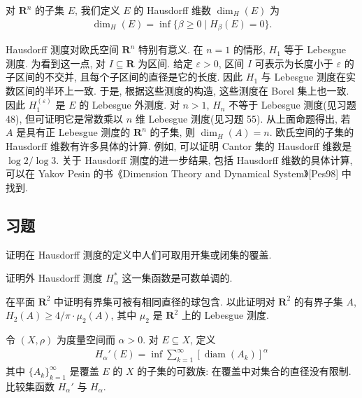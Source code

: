 \documentclass[../../main.tex]{subfiles}
\begin{document}
对 $\mathbf{R}^{n}$ 的子集 $E$, 我们定义 $E$ 的 Hausdorff 维数 $\dim_{H}(E)$ 为
\begin{align*}
\dim_{H}(E)=\inf\{\beta\geqslant 0\mid H_{\beta}(E)=0\}.
\end{align*}

Hausdorff 测度对欧氏空间 $\mathbf{R}^{n}$ 特别有意义. 在 $n=1$ 的情形, $H_{1}$ 等于 Lebesgue 测度. 为看到这一点, 对 $I\subseteq\mathbf{R}$ 为区间. 给定 $\varepsilon>0$, 区间 $I$ 可表示为长度小于 $\varepsilon$ 的子区间的不交并, 且每个子区间的直径是它的长度. 因此 $H_{1}$ 与 Lebesgue 测度在实数区间的半环上一致. 于是, 根据这些测度的构造, 这些测度在 Borel 集上也一致. 因此 $H_{1}^{(\varepsilon)}$ 是 $E$ 的 Lebesgue 外测度. 对 $n>1$, $H_{n}$ 不等于 Lebesgue 测度(见习题 48), 但可证明它是常数乘以 $n$ 维 Lebesgue 测度(见习题 55). 从上面命题得出, 若 $A$ 是具有正 Lebesgue 测度的 $\mathbf{R}^{n}$ 的子集, 则 $\dim_{H}(A)=n$. 欧氏空间的子集的 Hausdorff 维数有许多具体的计算. 例如, 可以证明 Cantor 集的 Hausdorff 维数是 $\log 2/\log 3$. 关于 Hausdorff 测度的进一步结果, 包括 Hausdorff 维数的具体计算, 可以在 Yakov Pesin 的书《Dimension Theory and Dynamical System》[Pes98] 中找到.

\subsection*{习题}

\begin{exercise}\label{exercise:ch20-46}
证明在 Hausdorff 测度的定义中人们可取用开集或闭集的覆盖.
\end{exercise}

\begin{exercise}\label{exercise:ch20-47}
证明外 Hausdorff 测度 $H_{\alpha}^{*}$ 这一集函数是可数单调的.
\end{exercise}

\begin{exercise}\label{exercise:ch20-48}
在平面 $\mathbf{R}^{2}$ 中证明有界集可被有相同直径的球包含. 以此证明对 $\mathbf{R}^{2}$ 的有界子集 $A$, $H_{2}(A)\geqslant 4/\pi\cdot\mu_{2}(A)$, 其中 $\mu_{2}$ 是 $\mathbf{R}^{2}$ 上的 Lebesgue 测度.
\end{exercise}

\begin{exercise}\label{exercise:ch20-49}
令 $(X,\rho)$ 为度量空间而 $\alpha>0$. 对 $E\subseteq X$, 定义
\begin{align*}
H_{\alpha}'(E)=\inf\sum_{k=1}^{\infty}[\operatorname{diam}(A_{k})]^{\alpha}
\end{align*}
其中 $\{A_{k}\}_{k=1}^{\infty}$ 是覆盖 $E$ 的 $X$ 的子集的可数族: 在覆盖中对集合的直径没有限制. 比较集函数 $H_{\alpha}'$ 与 $H_{\alpha}$.
\end{exercise}
\end{document}
